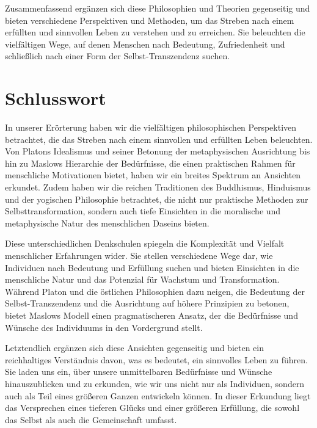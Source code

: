 \documentclass[12pt,a4paper]{article}
\begin{document}
Zusammenfassend ergänzen sich diese Philosophien und Theorien gegenseitig und bieten verschiedene Perspektiven und Methoden, um das Streben nach einem erfüllten und sinnvollen Leben zu verstehen und zu erreichen. Sie beleuchten die vielfältigen Wege, auf denen Menschen nach Bedeutung, Zufriedenheit und schließlich nach einer Form der Selbst-Transzendenz suchen.


\section{Schlusswort}
In unserer Erörterung haben wir die vielfältigen philosophischen Perspektiven betrachtet, die das Streben nach einem sinnvollen und erfüllten Leben beleuchten. Von Platons Idealismus und seiner Betonung der metaphysischen Ausrichtung bis hin zu Maslows Hierarchie der Bedürfnisse, die einen praktischen Rahmen für menschliche Motivationen bietet, haben wir ein breites Spektrum an Ansichten erkundet. Zudem haben wir die reichen Traditionen des Buddhismus, Hinduismus und der yogischen Philosophie betrachtet, die nicht nur praktische Methoden zur Selbsttransformation, sondern auch tiefe Einsichten in die moralische und metaphysische Natur des menschlichen Daseins bieten.

Diese unterschiedlichen Denkschulen spiegeln die Komplexität und Vielfalt menschlicher Erfahrungen wider. Sie stellen verschiedene Wege dar, wie Individuen nach Bedeutung und Erfüllung suchen und bieten Einsichten in die menschliche Natur und das Potenzial für Wachstum und Transformation. Während Platon und die östlichen Philosophien dazu neigen, die Bedeutung der Selbst-Transzendenz und die Ausrichtung auf höhere Prinzipien zu betonen, bietet Maslows Modell einen pragmatischeren Ansatz, der die Bedürfnisse und Wünsche des Individuums in den Vordergrund stellt.

Letztendlich ergänzen sich diese Ansichten gegenseitig und bieten ein reichhaltiges Verständnis davon, was es bedeutet, ein sinnvolles Leben zu führen. Sie laden uns ein, über unsere unmittelbaren Bedürfnisse und Wünsche hinauszublicken und zu erkunden, wie wir uns nicht nur als Individuen, sondern auch als Teil eines größeren Ganzen entwickeln können. In dieser Erkundung liegt das Versprechen eines tieferen Glücks und einer größeren Erfüllung, die sowohl das Selbst als auch die Gemeinschaft umfasst.


\printbibliography
\end{document}
